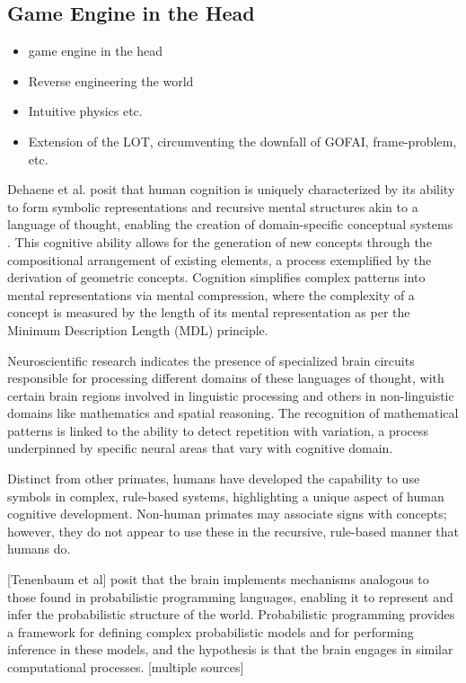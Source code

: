 \subsection{Game Engine in the Head}

\begin{itemize}
    \item game engine in the head
    \item Reverse engineering the world
    \item Intuitive physics etc. 
    \item Extension of the LOT, circumventing the downfall of GOFAI, frame-problem, etc. 
\end{itemize}


Dehaene et al. posit that human cognition is uniquely characterized by its ability to form symbolic representations and recursive mental structures akin to a language of thought, enabling the creation of domain-specific conceptual systems \cite{dehaene_symbols_2022}. This cognitive ability allows for the generation of new concepts through the compositional arrangement of existing elements, a process exemplified by the derivation of geometric concepts. Cognition simplifies complex patterns into mental representations via mental compression, where the complexity of a concept is measured by the length of its mental representation as per the Minimum Description Length (MDL) principle.

Neuroscientific research indicates the presence of specialized brain circuits responsible for processing different domains of these languages of thought, with certain brain regions involved in linguistic processing and others in non-linguistic domains like mathematics and spatial reasoning. The recognition of mathematical patterns is linked to the ability to detect repetition with variation, a process underpinned by specific neural areas that vary with cognitive domain.

Distinct from other primates, humans have developed the capability to use symbols in complex, rule-based systems, highlighting a unique aspect of human cognitive development. Non-human primates may associate signs with concepts; however, they do not appear to use these in the recursive, rule-based manner that humans do.

[Tenenbaum et al] posit that the brain implements mechanisms analogous to those found in probabilistic programming languages, enabling it to represent and infer the probabilistic structure of the world. Probabilistic programming provides a framework for defining complex probabilistic models and for performing inference in these models, and the hypothesis is that the brain engages in similar computational processes. [multiple sources]

